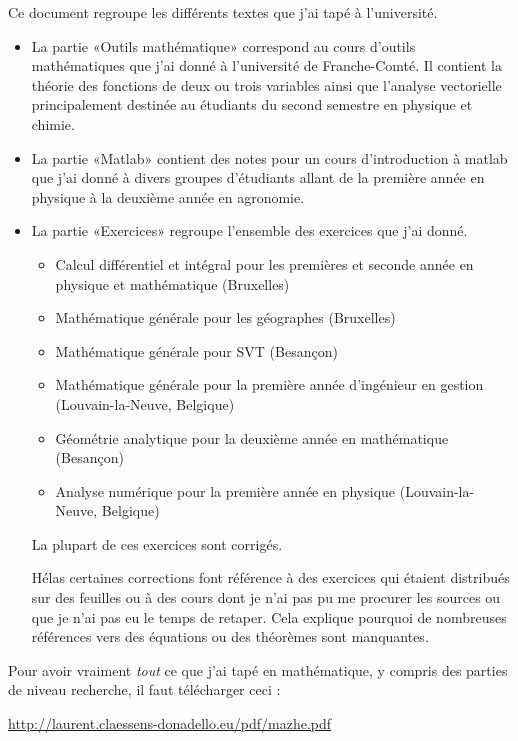 Ce document regroupe les différents textes que j'ai tapé à l'université.
\begin{itemize}
    \item La partie «Outils mathématique» correspond au cours d'outils mathématiques que j'ai donné à l'université de Franche-Comté. Il contient la théorie des fonctions de deux ou trois variables ainsi que l'analyse vectorielle principalement destinée au étudiants du second semestre en physique et chimie.
    \item La partie «Matlab» contient des notes pour un cours d'introduction à matlab que j'ai donné à divers groupes d'étudiants allant de la première année en physique à la deuxième année en agronomie.

    \item La partie «Exercices» regroupe l'ensemble des exercices que j'ai donné.

        \begin{itemize}
            \item Calcul différentiel et intégral pour les premières et seconde année en physique et mathématique (Bruxelles)
            \item Mathématique générale pour les géographes (Bruxelles)
            \item Mathématique générale pour SVT (Besançon)
            \item Mathématique générale pour la première année d'ingénieur en gestion (Louvain-la-Neuve, Belgique)
            \item Géométrie analytique pour la deuxième année en mathématique (Besançon)
            \item Analyse numérique pour la première année en physique (Louvain-la-Neuve, Belgique)
        \end{itemize}
        La plupart de ces exercices sont corrigés.

        Hélas certaines corrections font référence à des exercices qui étaient distribués sur des feuilles ou à des cours dont je n'ai pas pu me procurer les sources ou que je n'ai pas eu le temps de retaper. Cela explique pourquoi de nombreuses références vers des équations ou des théorèmes sont manquantes.
\end{itemize}

\vfill

Pour avoir vraiment \emph{tout} ce que j'ai tapé en mathématique, y compris des parties de niveau recherche, il faut télécharger ceci :
\begin{center}
    \url{http://laurent.claessens-donadello.eu/pdf/mazhe.pdf}
\end{center}

\clearpage

